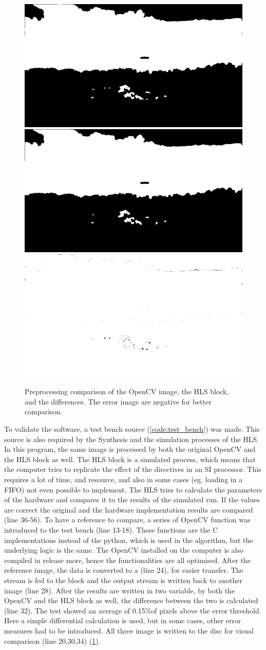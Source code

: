 \begin{figure}
    \centering
    \includegraphics[width=.32\linewidth]{images/preproc/out_ocv.jpg}
    \includegraphics[width=.32\linewidth]{images/preproc/hls_out.jpg}
    \includegraphics[width=.32\linewidth]{images/preproc/error_negative.png}
    \caption{Preprocessing comparison of the OpenCV image, the HLS block, and the differences. The error image are negative for better comparison.}
    \label{fig:preproc_compare}
\end{figure}

To validate the software, a test bench source (\cref{code:test_bench}) was made.
This source is also required by the Synthesis and the simulation processes of the HLS.
In this program, the same image is processed by both the original OpenCV and the HLS block as well.
The HLS block is a simulated process, which means that the computer tries to replicate the effect of the directives in an SI processor.
This requires a lot of time, and resource, and also in some cases (eg. loading in a FIFO) not even possible to implement.
The HLS tries to calculate the parameters of the hardware and compares it to the results of the simulated run.
If the values are correct the original and the hardware implementation results are compared (line 36-56).
To have a reference to compare, a series of OpenCV function was introduced to the test bench (line 13-18).
These functions are the C implementations instead of the python, which is used in the algorithm, but the underlying logic is the same.
The OpenCV installed on the computer is also compiled in release more, hence the functionalities are all optimised.
After the reference image, the data is converted to a  (line 24), for easier transfer.
The stream is fed to the block and the output stream is written back to another image (line 28).
After the results are written in two variable, by both the OpenCV and the HLS block as well, the difference between the two is calculated (line 32).
The test showed an average of 0.15\%of pixels above the error threshold.
Here a simple differential calculation is used, but in some cases, other error measures had to be introduced.
All three image is written to the disc for visual comparison (line 20,30,34) (\cref{fig:preproc_compare}).

